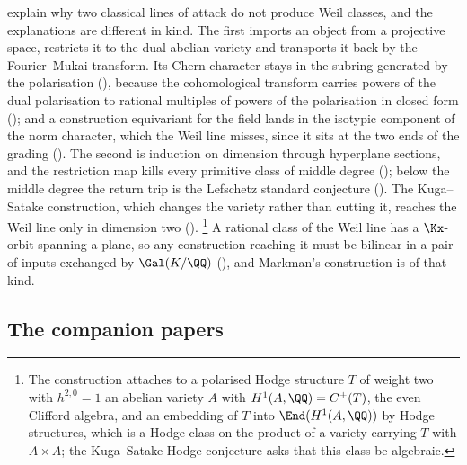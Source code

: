  explain why two classical lines of attack do not
produce Weil classes, and the explanations are different in kind. The first
imports an object from a projective space, restricts it to the dual abelian
variety and transports it back by the Fourier--Mukai transform. Its Chern
character stays in the subring generated by the polarisation
(), because the cohomological transform carries powers of
the dual polarisation to rational multiples of powers of the polarisation in
closed form (); and a construction equivariant for the
field lands in the isotypic component of the norm character, which the Weil
line misses, since it sits at the two ends of the grading
(). The second is induction on dimension through
hyperplane sections, and the restriction map kills every primitive class of
middle degree (); below the middle degree the return
trip is the Lefschetz standard conjecture (). The
Kuga--Satake construction, which changes the variety rather than cutting it,
reaches the Weil line only in dimension two ().%
\footnote{The construction attaches to a polarised Hodge structure $T$ of
weight two with $h^{2,0}=1$ an abelian variety $A$ with
$H^{1}(A,\QQ)=C^{+}(T)$, the even Clifford algebra, and an embedding of
$T$ into $\End(H^{1}(A,\QQ))$ by Hodge structures, which is a Hodge class on
the product of a variety carrying $T$ with $A\times A$; the Kuga--Satake
Hodge conjecture asks that this class be algebraic.} A rational
class of the Weil line has a $\Kx$-orbit spanning a plane, so any
construction reaching it must be bilinear in a pair of inputs exchanged by
$\Gal(K/\QQ)$ (), and Markman's construction is of that
kind.


\subsection{The companion papers}

